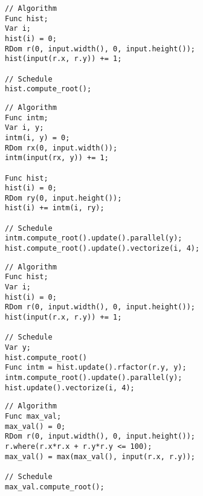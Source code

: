 \begin{lstlisting}[caption={Computing the histogram of a two-dimensional image in Halide. The RDom defines an implicit loop nest over \code{r.x} and \code{r.y}. Halide will not permit either of these loops to be parallelized, as that would introduce a race condition on the += operation.}, label={lst:histogram_rfactor_1}]
// Algorithm
Func hist;
Var i;
hist(i) = 0;
RDom r(0, input.width(), 0, input.height());
hist(input(r.x, r.y)) += 1;

// Schedule
hist.compute_root();
\end{lstlisting}

\begin{lstlisting}[caption={A manually-factored histogram. The programmer has introduced an intermediate function that computes the histogram over each row of the input. This intermediate is data-parallel over y, and so it can be parallelized. The original function \code{hist} now merely sums these partial histograms. It is data-parallel over histogram buckets, and the programmer has vectorized it.}, label={lst:histogram_rfactor_2}]
// Algorithm
Func intm;
Var i, y;
intm(i, y) = 0;
RDom rx(0, input.width());
intm(input(rx, y)) += 1;

Func hist;
hist(i) = 0;
RDom ry(0, input.height());
hist(i) += intm(i, ry);

// Schedule
intm.compute_root().update().parallel(y);
hist.compute_root().update().vectorize(i, 4);
\end{lstlisting}

\begin{lstlisting}[caption={Using \code{rfactor}, the programmer can produce the same machine code as in \ref{lst:histogram_rfactor_2}, using the simpler algorithm in \ref{lst:histogram_rfactor_1}. While the schedule is more complex, recall that it is only the five lines of algorithm that determines correctness. The programmer was able to transform the code to exploit parallelism without risking introducing a correctness bug.}, label={lst:histogram_rfactor_3}]
// Algorithm
Func hist;
Var i;
hist(i) = 0;
RDom r(0, input.width(), 0, input.height());
hist(input(r.x, r.y)) += 1;

// Schedule
Var y;
hist.compute_root()
Func intm = hist.update().rfactor(r.y, y);
intm.compute_root().update().parallel(y);
hist.update().vectorize(i, 4);
\end{lstlisting}

\begin{lstlisting}[caption={Computing the maximum over a circular domain. Reduction domains need not be rectangular. In this case we use \code{RDom::where} to restrict it to the points that lie within a circle of radius 10.}, label={lst:circular_max_1}]
// Algorithm
Func max_val;
max_val() = 0;
RDom r(0, input.width(), 0, input.height());
r.where(r.x*r.x + r.y*r.y <= 100);
max_val() = max(max_val(), input(r.x, r.y));

// Schedule
max_val.compute_root();
\end{lstlisting}

